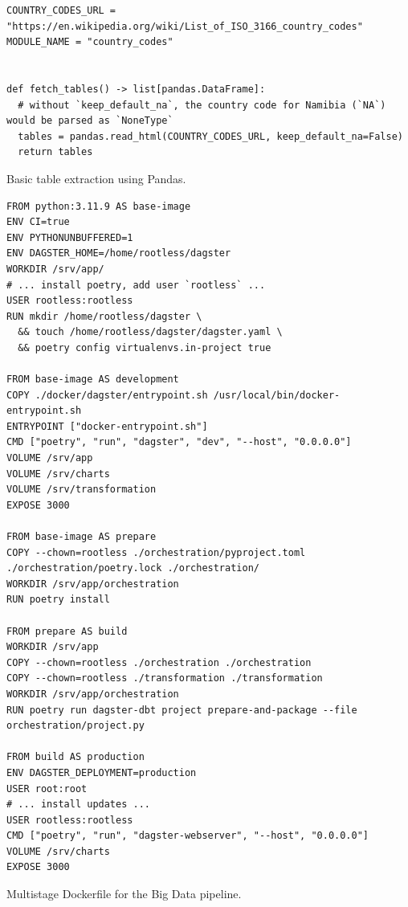\begin{listing}[H]
\begin{verbatim}
COUNTRY_CODES_URL = "https://en.wikipedia.org/wiki/List_of_ISO_3166_country_codes"
MODULE_NAME = "country_codes"


def fetch_tables() -> list[pandas.DataFrame]:
  # without `keep_default_na`, the country code for Namibia (`NA`) would be parsed as `NoneType`
  tables = pandas.read_html(COUNTRY_CODES_URL, keep_default_na=False)
  return tables
\end{verbatim}
\caption{Basic table extraction using Pandas.}
\label{lst:appendix-listings-pandas-tables}
\end{listing}

\begin{listing}[H]
\begin{verbatim}
FROM python:3.11.9 AS base-image
ENV CI=true
ENV PYTHONUNBUFFERED=1
ENV DAGSTER_HOME=/home/rootless/dagster
WORKDIR /srv/app/
# ... install poetry, add user `rootless` ...
USER rootless:rootless
RUN mkdir /home/rootless/dagster \
  && touch /home/rootless/dagster/dagster.yaml \
  && poetry config virtualenvs.in-project true

FROM base-image AS development
COPY ./docker/dagster/entrypoint.sh /usr/local/bin/docker-entrypoint.sh
ENTRYPOINT ["docker-entrypoint.sh"]
CMD ["poetry", "run", "dagster", "dev", "--host", "0.0.0.0"]
VOLUME /srv/app
VOLUME /srv/charts
VOLUME /srv/transformation
EXPOSE 3000

FROM base-image AS prepare
COPY --chown=rootless ./orchestration/pyproject.toml ./orchestration/poetry.lock ./orchestration/
WORKDIR /srv/app/orchestration
RUN poetry install

FROM prepare AS build
WORKDIR /srv/app
COPY --chown=rootless ./orchestration ./orchestration
COPY --chown=rootless ./transformation ./transformation
WORKDIR /srv/app/orchestration
RUN poetry run dagster-dbt project prepare-and-package --file orchestration/project.py

FROM build AS production
ENV DAGSTER_DEPLOYMENT=production
USER root:root
# ... install updates ...
USER rootless:rootless
CMD ["poetry", "run", "dagster-webserver", "--host", "0.0.0.0"]
VOLUME /srv/charts
EXPOSE 3000
\end{verbatim}
\caption{Multistage Dockerfile for the Big Data pipeline.}
\label{lst:appendix-listings-dockerfile}
\end{listing}

